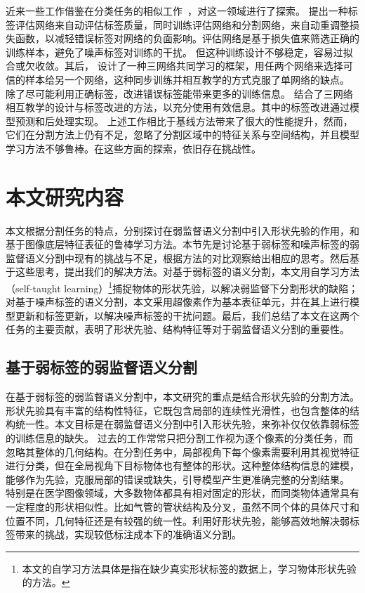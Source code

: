 近来一些工作借鉴在分类任务的相似工作~\citep{arpit2017closer,Han2018CoteachingRT,Wei2020CombatingNL}，对这一领域进行了探索。
\citet{Zhu2019PickandLearnAQ} 提出一种标签评估网络来自动评估标签质量，同时训练评估网络和分割网络，来自动重调整损失函数，以减轻错误标签对网络的负面影响。评估网络是基于损失值来筛选正确的训练样本，避免了噪声标签对训练的干扰。
但这种训练设计不够稳定，容易过拟合或欠收敛。其后，\citet{Zhang2020RobustMI} 设计了一种三网络共同学习的框架，用任两个网络来选择可信的样本给另一个网络，这种同步训练并相互教学的方式克服了单网络的缺点。
除了尽可能利用正确标签，改进错误标签能带来更多的训练信息。\citet{Xue2020CascadedRL} 结合了三网络相互教学的设计与标签改进的方法，以充分使用有效信息。其中的标签改进通过模型预测和后处理实现。
上述工作相比于基线方法带来了很大的性能提升，然而，它们在分割方法上仍有不足，忽略了分割区域中的特征关系与空间结构，并且模型学习方法不够鲁棒。在这些方面的探索，依旧存在挑战性。


\section{本文研究内容}
本文根据分割任务的特点，分别探讨在弱监督语义分割中引入形状先验的作用，和基于图像底层特征表征的鲁棒学习方法。本节先是讨论基于弱标签和噪声标签的弱监督语义分割中现有的挑战与不足，根据方法的对比观察给出相应的思考。然后基于这些思考，提出我们的解决方法。对基于弱标签的语义分割，本文用自学习方法（self-taught learning）\footnote{本文的自学习方法具体是指在缺少真实形状标签的数据上，学习物体形状先验的方法。}捕捉物体的形状先验，以解决弱监督下分割形状的缺陷；对基于噪声标签的语义分割，本文采用超像素作为基本表征单元，并在其上进行模型更新和标签更新，以解决噪声标签的干扰问题。最后，我们总结了本文在这两个任务的主要贡献，表明了形状先验、结构特征等对于弱监督语义分割的重要性。

\subsection{基于弱标签的弱监督语义分割}
在基于弱标签的弱监督语义分割中，本文研究的重点是结合形状先验的分割方法。形状先验具有丰富的结构性特征，它既包含局部的连续性光滑性，也包含整体的结构统一性。本文目标是在弱监督语义分割中引入形状先验，来弥补仅仅依靠弱标签的训练信息的缺失。
过去的工作常常只把分割工作视为逐个像素的分类任务，而忽略其整体的几何结构。在分割任务中，局部视角下每个像素需要利用其视觉特征进行分类，但在全局视角下目标物体也有整体的形状。这种整体结构信息的建模，能够作为先验，克服局部的错误或缺失，引导模型产生更准确完整的分割结果。
特别是在医学图像领域，大多数物体都具有相对固定的形状，而同类物体通常具有一定程度的形状相似性。比如气管的管状结构及分叉，虽然不同个体的具体尺寸和位置不同，几何特征还是有较强的统一性。利用好形状先验，能够高效地解决弱标签带来的挑战，实现较低标注成本下的准确语义分割。

